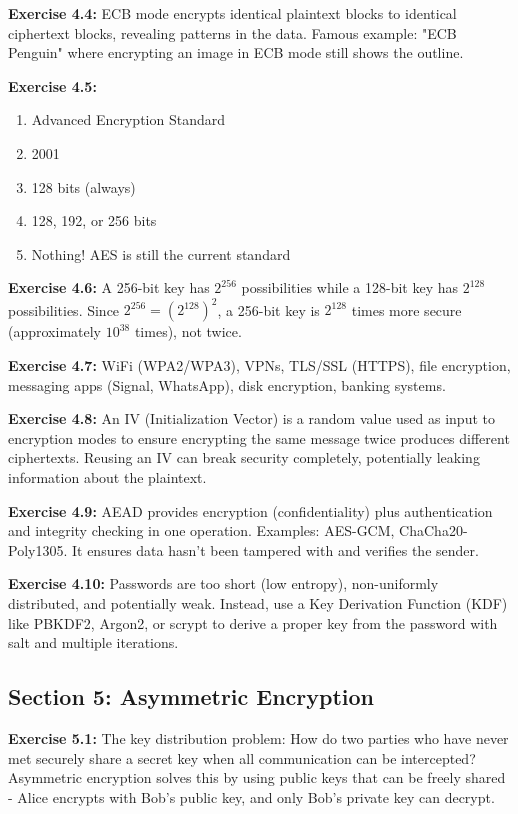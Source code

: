 \documentclass[11pt,a4paper]{report}
\begin{document}
\textbf{Exercise 4.4:}
ECB mode encrypts identical plaintext blocks to identical ciphertext blocks, revealing patterns in the data. Famous example: "ECB Penguin" where encrypting an image in ECB mode still shows the outline.

\textbf{Exercise 4.5:}
\begin{enumerate}[label=\alph*)]
    \item Advanced Encryption Standard
    \item 2001
    \item 128 bits (always)
    \item 128, 192, or 256 bits
    \item Nothing! AES is still the current standard
\end{enumerate}

\textbf{Exercise 4.6:}
A 256-bit key has $2^{256}$ possibilities while a 128-bit key has $2^{128}$ possibilities. Since $2^{256} = (2^{128})^2$, a 256-bit key is $2^{128}$ times more secure (approximately $10^{38}$ times), not twice.

\textbf{Exercise 4.7:}
WiFi (WPA2/WPA3), VPNs, TLS/SSL (HTTPS), file encryption, messaging apps (Signal, WhatsApp), disk encryption, banking systems.

\textbf{Exercise 4.8:}
An IV (Initialization Vector) is a random value used as input to encryption modes to ensure encrypting the same message twice produces different ciphertexts. Reusing an IV can break security completely, potentially leaking information about the plaintext.

\textbf{Exercise 4.9:}
AEAD provides encryption (confidentiality) plus authentication and integrity checking in one operation. Examples: AES-GCM, ChaCha20-Poly1305. It ensures data hasn't been tampered with and verifies the sender.

\textbf{Exercise 4.10:}
Passwords are too short (low entropy), non-uniformly distributed, and potentially weak. Instead, use a Key Derivation Function (KDF) like PBKDF2, Argon2, or scrypt to derive a proper key from the password with salt and multiple iterations.

\subsection*{Section 5: Asymmetric Encryption}

\textbf{Exercise 5.1:}
The key distribution problem: How do two parties who have never met securely share a secret key when all communication can be intercepted? Asymmetric encryption solves this by using public keys that can be freely shared - Alice encrypts with Bob's public key, and only Bob's private key can decrypt.
\end{document}
